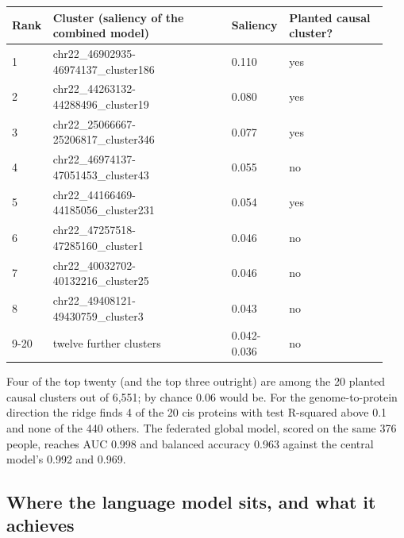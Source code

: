 \documentclass[11pt,a4paper]{article}
\begin{document}
\begin{longtable}{p{0.075\linewidth}p{0.470\linewidth}p{0.132\linewidth}p{0.263\linewidth}}
\toprule
\textbf{Rank} & \textbf{Cluster (saliency of the combined model)} & \textbf{Saliency} & \textbf{Planted causal cluster?} \\
\midrule
\endhead
1 & chr22\_46902935-46974137\_cluster186 & 0.110 & yes \\
2 & chr22\_44263132-44288496\_cluster19 & 0.080 & yes \\
3 & chr22\_25066667-25206817\_cluster346 & 0.077 & yes \\
4 & chr22\_46974137-47051453\_cluster43 & 0.055 & no \\
5 & chr22\_44166469-44185056\_cluster231 & 0.054 & yes \\
6 & chr22\_47257518-47285160\_cluster1 & 0.046 & no \\
7 & chr22\_40032702-40132216\_cluster25 & 0.046 & no \\
8 & chr22\_49408121-49430759\_cluster3 & 0.043 & no \\
9-20 & twelve further clusters & 0.042-0.036 & no \\
\bottomrule
\end{longtable}

Four of the top twenty (and the top three outright) are among the 20 planted causal clusters out of 6,551; by chance 0.06 would be. For the genome-to-protein direction the ridge finds 4 of the 20 cis proteins with test R-squared above 0.1 and none of the 440 others. The federated global model, scored on the same 376 people, reaches AUC 0.998 and balanced accuracy 0.963 against the central model's 0.992 and 0.969.

\subsection{Where the language model sits, and what it achieves}
\end{document}
